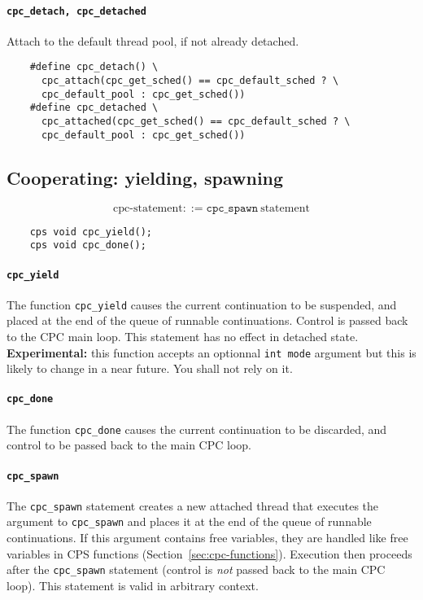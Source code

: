 \documentclass[a4paper]{report}
\begin{document}
\paragraph{\tt cpc\_detach, cpc\_detached} Attach to the default thread
pool, if not already detached.
\begin{verbatim}
    #define cpc_detach() \
      cpc_attach(cpc_get_sched() == cpc_default_sched ? \
      cpc_default_pool : cpc_get_sched())
    #define cpc_detached \
      cpc_attached(cpc_get_sched() == cpc_default_sched ? \
      cpc_default_pool : cpc_get_sched())
\end{verbatim}
\subsection{Cooperating: yielding, spawning} \label{sec:cooperating}

\[ \mbox{cpc-statement} ::=
   \mathtt{cpc\_spawn}\ \mbox{statement} \]
\begin{verbatim}
    cps void cpc_yield();
    cps void cpc_done();
\end{verbatim}

\paragraph{\tt cpc\_yield} The function {\tt cpc\_yield} causes the
current continuation to be suspended, and placed at the end of the
queue of runnable continuations.  Control is passed back to the CPC
main loop.  This statement has no effect in detached state.\\
{\bf Experimental:} this function accepts an optionnal {\tt int mode}
argument but this is likely to change in a near future.  You shall not
rely on it.

\paragraph{\tt cpc\_done} The function {\tt cpc\_done} causes the
current continuation to be discarded, and control to be passed back to
the main CPC loop.

\paragraph{\tt cpc\_spawn} The {\tt cpc\_spawn} statement creates a new
attached thread that executes the argument to {\tt cpc\_spawn} and
places it at the end of the queue of runnable continuations.  If this
argument contains free variables, they are handled like free variables
in CPS functions (Section~\ref{sec:cpc-functions}). Execution then
proceeds after the {\tt cpc\_spawn} statement (control is {\em not\/}
passed back to the main CPC loop).  This statement is valid in arbitrary
context.
\end{document}

